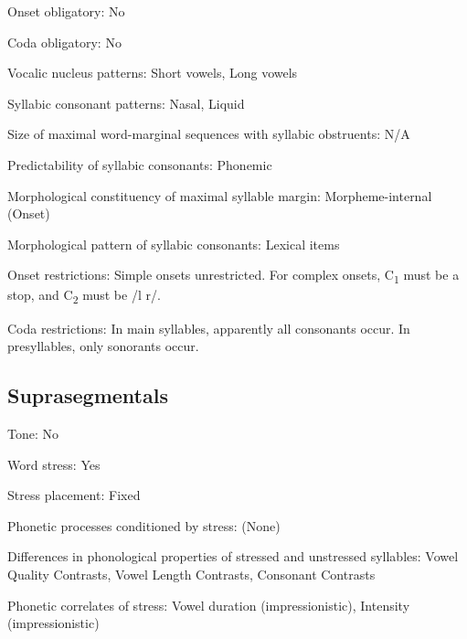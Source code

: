 {\begin{appendixdesc}
\item[Onset obligatory:] No

\item[Coda obligatory:] No

\item[Vocalic nucleus patterns:] Short vowels, Long vowels

\item[Syllabic consonant patterns:] Nasal, Liquid

\item[Size of maximal word-marginal sequences with syllabic obstruents:] N/A

\item[Predictability of syllabic consonants:] Phonemic

\item[Morphological constituency of maximal syllable margin:] Morpheme-internal (Onset)

\item[Morphological pattern of syllabic consonants:] Lexical items

\item[Onset restrictions:] Simple onsets unrestricted. For complex onsets, C\textsubscript{1} must be a stop, and C\textsubscript{2} must be /l r/. 

\item[Coda restrictions:] In main syllables, apparently all consonants occur. In presyllables, only sonorants occur.
\end{appendixdesc}
\subsection*{Suprasegmentals}
\begin{appendixdesc}
\item[Tone:] No

\item[Word stress:] Yes

\item[Stress placement:] Fixed

\item[Phonetic processes conditioned by stress:] (None)

\item[Differences in phonological properties of stressed and unstressed syllables:] Vowel Quality Contrasts, Vowel Length Contrasts, Consonant Contrasts

\item[Phonetic correlates of stress:] Vowel duration (impressionistic), Intensity (impressionistic)
\end{appendixdesc}
}
